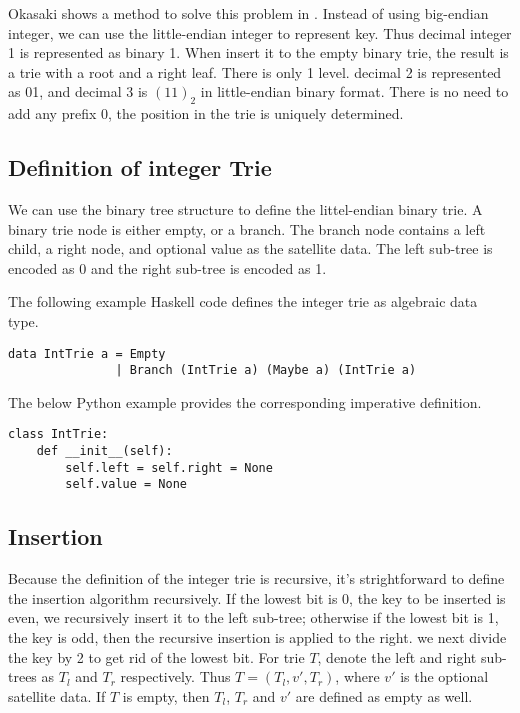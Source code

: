 \documentclass{article}
\begin{document}
Okasaki shows a method to solve this problem in \cite{okasaki-int-map}. Instead of
using big-endian integer, we can use the little-endian integer to represent key.
Thus decimal integer 1 is represented as binary 1. When insert it to the empty binary
trie, the result is a trie with a root and a right leaf.
There is only 1 level. decimal 2 is represented as 01, and decimal 3 is $(11)_2$
in little-endian binary format. There is no need to add
any prefix 0, the position in the trie is uniquely determined.

\subsection{Definition of integer Trie}
We can use the binary tree structure to define the littel-endian binary trie.
A binary trie node is either empty, or a branch. The branch
node contains a left child, a right node, and optional value as the
satellite data.
The left sub-tree is encoded as 0 and the right sub-tree
is encoded as 1.

The following example Haskell code defines the integer trie as algebraic data type.

\lstset{language=Haskell}
\begin{lstlisting}
data IntTrie a = Empty
               | Branch (IntTrie a) (Maybe a) (IntTrie a)
\end{lstlisting}

The below Python example provides the corresponding imperative definition.

\lstset{language=Python}
\begin{lstlisting}
class IntTrie:
    def __init__(self):
        self.left = self.right = None
        self.value = None
\end{lstlisting}


\subsection{Insertion}

Because the definition of the integer trie is recursive, it's strightforward to define the insertion algorithm recursively.
If the lowest bit is 0, the key to be inserted is even, we recursively insert it
to the left sub-tree; otherwise if the lowest bit is 1, the key is odd,
then the recursive insertion is applied to the right. we next divide the key by 2 to get
rid of the lowest bit. For trie $T$,
denote the left and right sub-trees as $T_l$ and $T_r$ respectively.
Thus $T = (T_l, v', T_r)$, where $v'$ is the optional satellite data.
If $T$ is empty, then $T_l$, $T_r$ and $v'$ are defined as empty as well.
\end{document}

